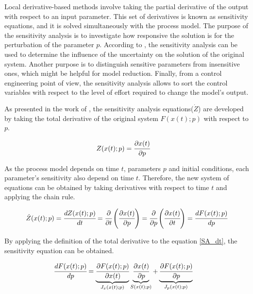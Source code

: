\documentclass[../Article_Model_Parameters.tex]{subfiles}
\begin{document}
	
	Local derivative-based methods involve taking the partial derivative of the output with respect to an input parameter. This set of derivatives is known as sensitivity equations, and it is solved simultaneously with the process model. The purpose of the sensitivity analysis is to investigate how responsive the solution is for the perturbation of the parameter ${p}$. According to \citet{Dickinson1976}, the sensitivity analysis can be used to determine the influence of the uncertainty on the solution of the original system. Another purpose is to distinguish sensitive parameters from insensitive ones, which might be helpful for model reduction. Finally, from a control engineering point of view, the sensitivity analysis allows to sort the control variables with respect to the level of effort required to change the model's output.
	
	As presented in the work of \citet{Maly1996}, the sensitivity analysis equations(${\dot{Z}}$) are developed by taking the total derivative of the original system ${F}({x}(t);{p})$ with respect to ${p}$.
	
	{\footnotesize
		\begin{align}
			{Z}({x}(t);{p}) &= \cfrac{\partial {x}(t)}{\partial {p}}
	\end{align} }
	
	As the process model depends on time $t$, parameters $p$ and initial conditions, each parameter's sensitivity also depend on time $t$. Therefore, the new system of equations can be obtained by taking derivatives with respect to time $t$ and applying the chain rule.
	
	{\footnotesize
		\begin{equation} \label{SA_dt} 
			{\dot{Z}}({x}(t);{p})  = \cfrac{d {Z}(x(t);{p})}{d t} = \cfrac{\partial }{\partial t} \left( \cfrac{\partial {x}(t)}{\partial {p}} \right) = \cfrac{\partial }{\partial {p}} \left( \cfrac{\partial {x}(t)}{\partial t} \right) = \cfrac{d {F}({x}(t);{p})}{d {p}} 
	\end{equation} }
	
	By applying the definition of the total derivative to the equation \ref{SA_dt}, the sensitivity equation can be obtained.
	
	{\footnotesize
		\begin{align}		
			\label{SA_eq_full}\cfrac{d {F}({x}(t);{p})}{d {p}} &=  \underbrace{ \cfrac{\partial {F}({x}(t);{p})}{\partial {x}(t)} }_{{J_x}({x}(t);{p})} \underbrace{\cfrac{\partial {x}(t)}{\partial {p}} }_{{S}({x}(t);{p})} + \underbrace{ \cfrac{\partial {F}({x}(t);{p})}{\partial {p}} }_{{J_p}({x}(t);{p})}
	\end{align} }
	
\end{document}
